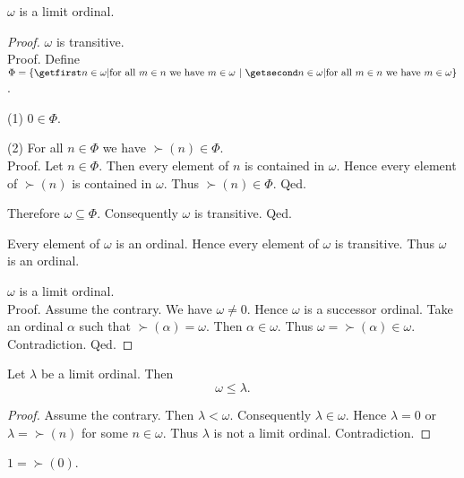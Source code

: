 \documentclass[../../set-theory/set-theory.tex]{subfiles}
\begin{document}
  \begin{forthel}
    \begin{proposition}
      $\omega$ is a limit ordinal.
    \end{proposition}
    \begin{proof}
      $\omega$ is transitive. \\
      Proof.
        Define $\Phi = \class{n \in \omega | \text{for all $m \in n$ we have
        $m \in \omega$}}$.

        (1) $0 \in \Phi$.

        (2) For all $n \in \Phi$ we have $\succ(n) \in \Phi$. \\
        Proof.
          Let $n \in \Phi$.
          Then every element of $n$ is contained in $\omega$.
          Hence every element of $\succ(n)$ is contained in $\omega$.
          Thus $\succ(n) \in \Phi$.
        Qed.

        Therefore $\omega \subseteq \Phi$.
        Consequently $\omega$ is transitive.
      Qed.

      Every element of $\omega$ is an ordinal.
      Hence every element of $\omega$ is transitive.
      Thus $\omega$ is an ordinal.

      $\omega$ is a limit ordinal. \\
      Proof.
        Assume the contrary.
        We have $\omega \neq 0$.
        Hence $\omega$ is a successor ordinal.
        Take an ordinal $\alpha$ such that $\succ(\alpha) = \omega$.
        Then $\alpha \in \omega$.
        Thus $\omega = \succ(\alpha) \in \omega$.
        Contradiction.
      Qed.
    \end{proof}
  \end{forthel}

  \begin{forthel}
    \begin{proposition}
      Let $\lambda$ be a limit ordinal.
      Then \[ \omega \leq \lambda. \]
    \end{proposition}
    \begin{proof}
      Assume the contrary.
      Then $\lambda < \omega$.
      Consequently $\lambda \in \omega$.
      Hence $\lambda = 0$ or $\lambda = \succ(n)$ for some $n \in \omega$.
      Thus $\lambda$ is not a limit ordinal.
      Contradiction.
    \end{proof}
  \end{forthel}

  \begin{forthel}
    \begin{definition}
      $1 = \succ(0)$.
    \end{definition}
  \end{forthel}
\end{document}
